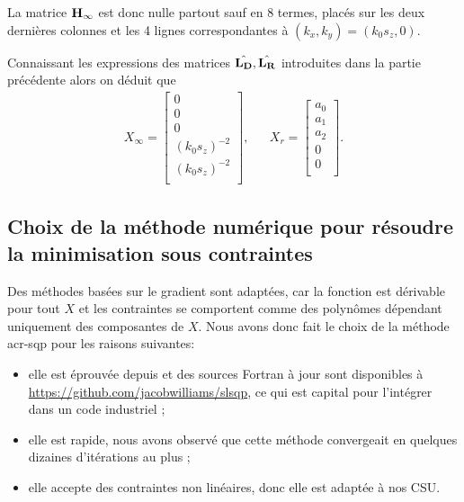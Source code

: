 La matrice \({\mathbf{H}}_\infty\) est donc nulle partout sauf en 8 termes, placés sur les deux dernières colonnes et les 4 lignes correspondantes à \((k_x,k_y)=(k_0 s_z,0)\).

Connaissant les expressions des matrices \(\hat{\mathbf{L_D}},\hat{\mathbf{L_R}}\) introduites dans la partie précédente alors on déduit que
\begin{align*}
  X_\infty = \begin{bmatrix}
    0\\
    0\\
    0\\
    (k_0 s_z)^{-2}\\
    (k_0 s_z)^{-2}\\
  \end{bmatrix},
  & &
  X_r = \begin{bmatrix}
  a_0\\
  a_1\\
  a_2\\
  0\\
  0\\
  \end{bmatrix}.
\end{align*}

\subsection{Choix de la méthode numérique pour résoudre la minimisation sous contraintes}

  Des méthodes basées sur le gradient sont adaptées, car la fonction est dérivable pour tout \(X\) et les contraintes se comportent comme des polynômes dépendant uniquement des composantes de \(X\). Nous avons donc fait le choix de la méthode \gls{acr-sqp} pour les raisons suivantes:
 
  \begin{itemize}
    \item elle est éprouvée depuis \cite{kraft_software_1988} et des sources Fortran à jour sont disponibles à \url{https://github.com/jacobwilliams/slsqp}, ce qui est capital pour l'intégrer dans un code industriel ;
    \item elle est rapide, nous avons observé que cette méthode convergeait en quelques dizaines d'itérations au plus ;
    \item elle accepte des contraintes non linéaires, donc elle est adaptée à nos CSU.
  \end{itemize}


